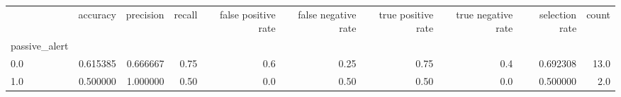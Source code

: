 \begin{tabular}{lrrrrrrrrr}
\toprule
{} &  accuracy &  precision &  recall &  false positive rate &  false negative rate &  true positive rate &  true negative rate &  selection rate &  count \\
passive\_alert &           &            &         &                      &                      &                     &                     &                 &        \\
\midrule
0.0           &  0.615385 &   0.666667 &    0.75 &                  0.6 &                 0.25 &                0.75 &                 0.4 &        0.692308 &   13.0 \\
1.0           &  0.500000 &   1.000000 &    0.50 &                  0.0 &                 0.50 &                0.50 &                 0.0 &        0.500000 &    2.0 \\
\bottomrule
\end{tabular}
